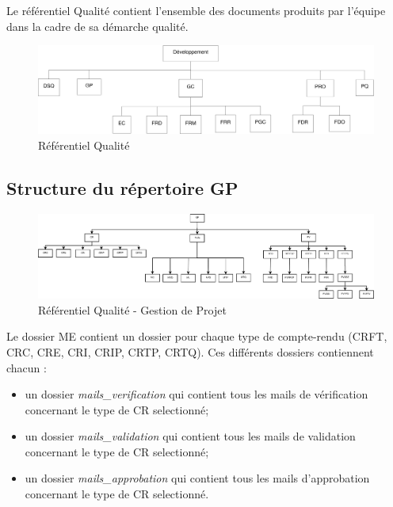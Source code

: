 
Le référentiel Qualité contient l'ensemble des documents produits par l'équipe \nomEquipe{} dans la cadre de sa démarche qualité.

\begin{figure}[ht]
         \begin{center}
         \includegraphics[scale=0.5]{images/arboQualite}
         \end{center}
         \caption{Référentiel Qualité}
 \end{figure}

\clearpage 

\subsection{Structure du répertoire GP}

\begin{figure}[ht]
         \begin{center}
         \includegraphics[scale=0.24]{images/arboGP}
         \end{center}
         \caption{Référentiel Qualité - Gestion de Projet}
 \end{figure}
 Le dossier ME contient un dossier pour chaque type de compte-rendu (CRFT, CRC, CRE, CRI, CRIP, CRTP, CRTQ). Ces différents dossiers contiennent chacun : 
 \begin{itemize}
   \item un dossier \emph{mails\_verification} qui contient tous les mails de vérification concernant le type de CR selectionné;
   \item un dossier \emph{mails\_validation} qui contient tous les mails de validation concernant le type de CR selectionné;
   \item un dossier \emph{mails\_approbation} qui contient tous les mails d'approbation concernant le type de CR selectionné.
 \end{itemize}
 
